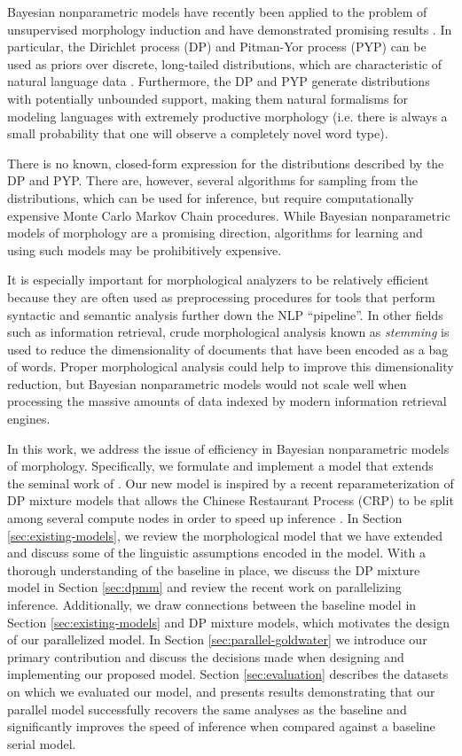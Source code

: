Bayesian nonparametric models have recently been applied to the
problem of unsupervised morphology induction and have demonstrated
promising results \cite{goldwater2011,dreyer2011,lee2011}. In
particular, the Dirichlet process (DP) and Pitman-Yor process (PYP)
can be used as priors over discrete, long-tailed distributions, which
are characteristic of natural language data
\cite{goldwater2011}. Furthermore, the DP and PYP generate
distributions with potentially unbounded support, making them natural
formalisms for modeling languages with extremely productive morphology
(i.e. there is always a small probability that one will observe a
completely novel word type).

There is no known, closed-form expression for the distributions
described by the DP and PYP. There are, however, several algorithms
for sampling from the distributions, which can be used for inference,
but require computationally expensive Monte Carlo Markov Chain
procedures. While Bayesian nonparametric models of morphology are a
promising direction, algorithms for learning and using such models may
be prohibitively expensive.

It is especially important for morphological analyzers to be
relatively efficient because they are often used as preprocessing
procedures for tools that perform syntactic and semantic analysis
further down the NLP ``pipeline''. In other fields such as information
retrieval, crude morphological analysis known as \textit{stemming} is
used to reduce the dimensionality of documents that have been encoded
as a bag of words. Proper morphological analysis could help to improve
this dimensionality reduction, but Bayesian nonparametric models would
not scale well when processing the massive amounts of data indexed by
modern information retrieval engines.

In this work, we address the issue of efficiency in Bayesian
nonparametric models of morphology. Specifically, we formulate and
implement a model that extends the seminal work of
\cite{goldwater2011}. Our new model is inspired by a recent
reparameterization of DP mixture models that allows the Chinese
Restaurant Process (CRP) to be split among several compute nodes in
order to speed up inference \cite{williamson2013}. In Section
\ref{sec:existing-models}, we review the morphological model that we
have extended and discuss some of the linguistic assumptions encoded
in the model. With a thorough understanding of the baseline in place,
we discuss the DP mixture model in Section \ref{sec:dpmm} and review
the recent work on parallelizing inference. Additionally, we draw
connections between the baseline model in Section
\ref{sec:existing-models} and DP mixture models, which motivates the
design of our parallelized model. In Section
\ref{sec:parallel-goldwater} we introduce our primary contribution and
discuss the decisions made when designing and implementing our
proposed model. Section \ref{sec:evaluation} describes the datasets on
which we evaluated our model, and presents results demonstrating that
our parallel model successfully recovers the same analyses as the
baseline and significantly improves the speed of inference when
compared against a baseline serial model.

